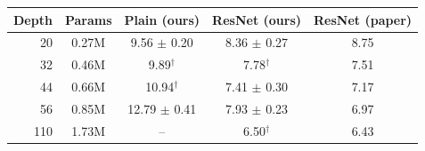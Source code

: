 \begin{tabular}{@{}rcccc@{}}
\toprule
Depth & Params & Plain (ours) & ResNet (ours) & ResNet (paper) \\
\midrule
20 & 0.27M & 9.56 $\pm$ 0.20 & 8.36 $\pm$ 0.27 & 8.75 \\
32 & 0.46M & 9.89$^{\dagger}$ & 7.78$^{\dagger}$ & 7.51 \\
44 & 0.66M & 10.94$^{\dagger}$ & 7.41 $\pm$ 0.30 & 7.17 \\
56 & 0.85M & 12.79 $\pm$ 0.41 & 7.93 $\pm$ 0.23 & 6.97 \\
110 & 1.73M & -- & 6.50$^{\dagger}$ & 6.43 \\
\bottomrule
\end{tabular}

